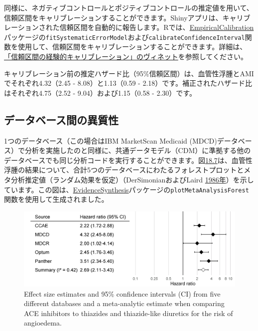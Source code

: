 \documentclass[
  11pt]{book}
\theoremstyle{definition}
\theoremstyle{definition}
\theoremstyle{definition}
\theoremstyle{definition}
\theoremstyle{remark}
\begin{document}
同様に、ネガティブコントロールとポジティブコントロールの推定値を用いて、信頼区間をキャリブレーションすることができます。Shinyアプリは、キャリブレーションされた信頼区間を自動的に報告します。Rでは、\href{https://ohdsi.github.io/EmpiricalCalibration/}{EmpiricalCalibration}パッケージの\texttt{fitSystematicErrorModel}および\texttt{calibrateConfidenceInterval}関数を使用して、信頼区間をキャリブレーションすることができます。詳細は、\href{https://ohdsi.github.io/EmpiricalCalibration/articles/EmpiricalCiCalibrationVignette.html}{「信頼区間の経験的キャリブレーション」のヴィネット}を参照してください。

キャリブレーション前の推定ハザード比（95\%信頼区間）は、血管性浮腫とAMIでそれぞれ4.32（2.45 - 8.08）と1.13（0.59 - 2.18）です。補正されたハザード比はそれぞれ4.75（2.52 - 9.04）および1.15（0.58 - 2.30）です。

\subsection{データベース間の異質性}\label{ux30c7ux30fcux30bfux30d9ux30fcux30b9ux9593ux306eux7570ux8ceaux6027}

1つのデータベース（この場合はIBM MarketScan Medicaid (MDCD)データベース）で分析を実施したのと同様に、共通データモデル（CDM）に準拠する他のデータベースでも同じ分析コードを実行することができます。図\href{https://ohdsi.github.io/TheBookOfOhdsi/MethodValidity.html\#fig:forest}{18.7}は、血管性浮腫の結果について、合計5つのデータベースにわたるフォレストプロットとメタ分析推定値（ランダム効果を仮定）（DerSimonianおよびLaird \href{https://ohdsi.github.io/TheBookOfOhdsi/MethodValidity.html\#ref-dersimonian_1986}{1986年}）を示しています。この図は、\href{https://ohdsi.github.io/EvidenceSynthesis/}{EvidenceSynthesis}パッケージの\texttt{plotMetaAnalysisForest}関数を使用して生成されました。

\begin{figure}

{\centering \includegraphics[width=0.9\linewidth]{images/MethodValidity/forest} 

}

\caption{Effect size estimates and 95\% confidence intervals (CI) from five different databases and a meta-analytic estimate when comparing ACE inhibitors to thiazides and thiazide-like diuretics for the risk of angioedema.}\label{fig:forest}
\end{figure}
\end{document}
